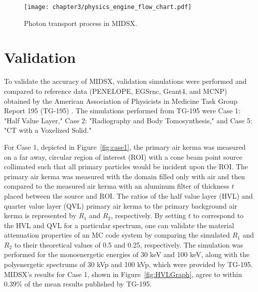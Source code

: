 \begin{figure}[H]
    \centering
	\texttt{[image: chapter3/physics\_engine\_flow\_chart.pdf]}
	\caption{Photon transport process in MIDSX.}
	\label{fig:PhysicsEngineFlowChart}
\end{figure}

\section{Validation}
\par To validate the accuracy of MIDSX, validation simulations were performed and compared to reference data (PENELOPE, EGSrnc, Geant4, and MCNP) obtained by the American Association of Physicists in Medicine Task Group Report 195 (TG-195) \cite{sechopoulos_monte_2015}. The simulations performed from TG-195 were Case 1: "Half Value Layer," Case 2: "Radiography and Body Tomosynthesis," and Case 5: "CT with a Voxelized Solid." 

\par For Case 1, depicted in Figure~\ref{fig:case1}, the primary air kerma was measured on a far away, circular region of interest (ROI) with a cone beam point source collimated such that all primary particles would be incident upon the ROI. The primary air kerma was measured with the domain filled only with air and then compared to the measured air kerma with an aluminum filter of thickness $t$ placed between the source and ROI. The ratios of the half value layer (HVL) and quarter value layer (QVL) primary air kerma to the primary background air kerma is represented by $R_1$ and $R_2$, respectively. By setting $t$ to correspond to the HVL and QVL for a particular spectrum, one can validate the material attenuation properties of an MC code system by comparing the simulated $R_1$ and $R_2$ to their theoretical values of 0.5 and 0.25, respectively. The simulation was performed for the monoenergetic energies of 30 keV and 100 keV, along with the polyenergetic spectrums of 30 kVp and 100 kVp, which were provided by TG-195. MIDSX's results for Case 1, shown in Figure~\ref{fig:HVLGraph}, agree to within 0.39\% of the mean results published by TG-195.

